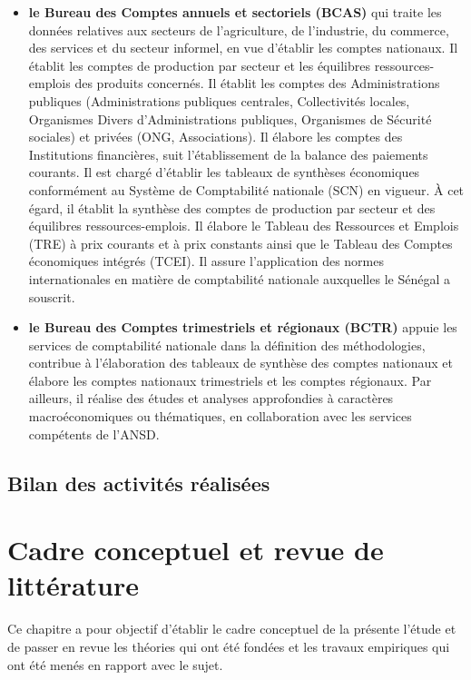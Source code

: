 \documentclass[12pt,a4paper,oneside]{report}
\begin{document}
\begin{itemize}

\item \textbf{le Bureau des Comptes annuels et sectoriels (BCAS)} qui traite les données relatives aux secteurs de l'agriculture, de l’industrie, du commerce, des services et
du secteur informel, en vue d’établir les comptes nationaux. Il établit les comptes de production par secteur
et les équilibres ressources-emplois des produits concernés. Il établit les comptes des Administrations
publiques (Administrations publiques centrales, Collectivités locales, Organismes Divers d'Administrations
publiques, Organismes de Sécurité sociales) et privées (ONG, Associations). Il élabore les comptes des
Institutions financières, suit l'établissement de la balance des paiements courants. Il est chargé d'établir
les tableaux de synthèses économiques conformément au Système de Comptabilité nationale (SCN) en vigueur. À
cet égard, il établit la synthèse des comptes de production par secteur et des équilibres ressources-emplois.
Il élabore le Tableau des Ressources et Emplois (TRE) à prix courants et à prix constants ainsi que le Tableau
des Comptes économiques intégrés (TCEI). Il assure l'application des normes internationales en matière de
comptabilité nationale auxquelles le Sénégal a souscrit.

\item \textbf{le Bureau des Comptes trimestriels et régionaux (BCTR)} appuie les services de comptabilité nationale dans la définition des méthodologies, contribue à l’élaboration
des tableaux de synthèse des comptes nationaux et élabore les comptes nationaux trimestriels et les comptes
régionaux. Par ailleurs, il réalise des études et analyses approfondies à caractères macroéconomiques ou
thématiques, en collaboration avec les services compétents de l'ANSD.

\end{itemize}

\section{Bilan des activités réalisées}

\chapter{Cadre conceptuel et revue de littérature}

\begin{introductionchapitre}
Ce chapitre a pour objectif d’établir le cadre conceptuel de la présente l’étude et de passer en revue les
théories qui ont été fondées et les travaux empiriques qui ont été menés en rapport avec le sujet.
\end{introductionchapitre}
\end{document}
